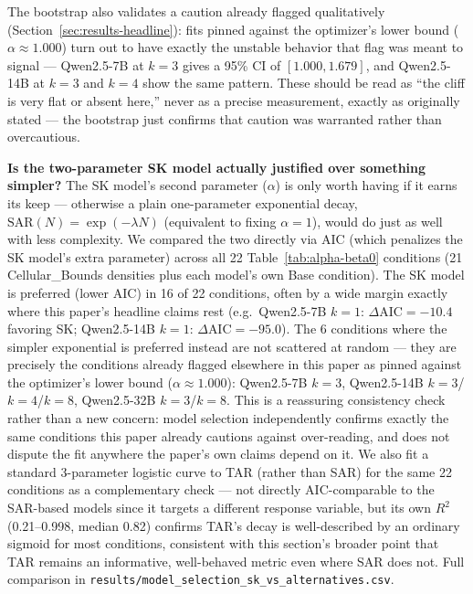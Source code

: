 \documentclass[11pt]{article}
\begin{document}
The bootstrap also validates a caution already flagged qualitatively (Section~\ref{sec:results-headline}): fits pinned against the optimizer's lower bound ($\alpha\approx 1.000$) turn out to have exactly the unstable behavior that flag was meant to signal --- Qwen2.5-7B at $k=3$ gives a 95\% CI of $[1.000, 1.679]$, and Qwen2.5-14B at $k=3$ and $k=4$ show the same pattern. These should be read as ``the cliff is very flat or absent here,'' never as a precise measurement, exactly as originally stated --- the bootstrap just confirms that caution was warranted rather than overcautious.

\textbf{Is the two-parameter SK model actually justified over something simpler?} The SK model's second parameter ($\alpha$) is only worth having if it earns its keep --- otherwise a plain one-parameter exponential decay, $\mathrm{SAR}(N)=\exp(-\lambda N)$ (equivalent to fixing $\alpha=1$), would do just as well with less complexity. We compared the two directly via AIC (which penalizes the SK model's extra parameter) across all 22 Table~\ref{tab:alpha-beta0} conditions (21 Cellular\_Bounds densities plus each model's own Base condition). The SK model is preferred (lower AIC) in 16 of 22 conditions, often by a wide margin exactly where this paper's headline claims rest (e.g.\ Qwen2.5-7B $k=1$: $\Delta$AIC$=-10.4$ favoring SK; Qwen2.5-14B $k=1$: $\Delta$AIC$=-95.0$). The 6 conditions where the simpler exponential is preferred instead are not scattered at random --- they are precisely the conditions already flagged elsewhere in this paper as pinned against the optimizer's lower bound ($\alpha\approx1.000$): Qwen2.5-7B $k=3$, Qwen2.5-14B $k=3$/$k=4$/$k=8$, Qwen2.5-32B $k=3$/$k=8$. This is a reassuring consistency check rather than a new concern: model selection independently confirms exactly the same conditions this paper already cautions against over-reading, and does not dispute the fit anywhere the paper's own claims depend on it. We also fit a standard 3-parameter logistic curve to TAR (rather than SAR) for the same 22 conditions as a complementary check --- not directly AIC-comparable to the SAR-based models since it targets a different response variable, but its own $R^2$ (0.21--0.998, median 0.82) confirms TAR's decay is well-described by an ordinary sigmoid for most conditions, consistent with this section's broader point that TAR remains an informative, well-behaved metric even where SAR does not. Full comparison in \texttt{results/model\_selection\_sk\_vs\_alternatives.csv}.
\end{document}
